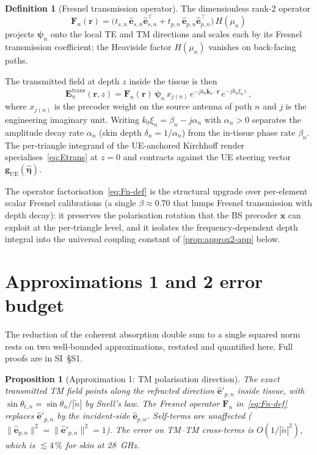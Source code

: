 \documentclass[journal,twocolumn,10pt]{IEEEtran}
\theoremstyle{plain}
\newtheorem{proposition}[theorem]{Proposition}
\theoremstyle{definition}
\newtheorem{definition}[theorem]{Definition}
\theoremstyle{remark}
\newcommand{\EE}{\mathbf{E}}
\newcommand{\Fn}{\mathbf{F}_n}
\newcommand{\psin}{\bm{\psi}_n}
\newcommand{\ntilde}{\tilde{n}}
\begin{document}
\begin{definition}[Fresnel transmission operator]\label{def:fresnel-op}
The dimensionless rank-2 operator
\begin{equation}\label{eq:Fn-def}
  \Fn(\bm{r}) =
  \bigl(t_{s,n}\,\hat{\bm{e}}_{s,n}\hat{\bm{e}}_{s,n}^{\!\top}
       + t_{p,n}\,\hat{\bm{e}}_{p,n}\hat{\bm{e}}_{p,n}^{\!\top}\bigr)\,H(\mu_n)
\end{equation}
projects $\psin$ onto the local TE and TM directions and scales each
by its Fresnel transmission coefficient; the Heaviside factor
$H(\mu_n)$ vanishes on back-facing paths.
\end{definition}

The transmitted field at depth $z$ inside the tissue is then
\begin{equation}\label{eq:Etrans}
  \EE_n^{\mathrm{trans}}(\bm{r},z)
  = \Fn(\bm{r})\,\psin\,x_{j(n)}\,
    e^{-jk_0\hat{\bm{k}}_n\cdot\bm{r}}\,
    e^{-jk_0\xi_n z}\,,
\end{equation}
where $x_{j(n)}$ is the precoder weight on the source antenna of
path $n$ and $j$ is the engineering imaginary unit. Writing
$k_0\xi_n = \beta_n - j\alpha_n$ with $\alpha_n > 0$ separates the
amplitude decay rate $\alpha_n$ (skin depth $\delta_n = 1/\alpha_n$)
from the in-tissue phase rate $\beta_n$. The per-triangle integrand
of the UE-anchored Kirchhoff render specialises~\eqref{eq:Etrans}
at $z = 0$ and contracts against the UE steering vector
$\bm{g}_{\mathrm{UE}}(\hat{\bm{\eta}})$.

The operator factorisation~\eqref{eq:Fn-def} is the structural
upgrade over per-element scalar Fresnel calibrations (a single
$\beta\approx 0.70$ that lumps Fresnel transmission with depth
decay): it preserves the polarisation rotation that the BS
precoder $\bm{x}$ can exploit at the per-triangle level, and it
isolates the frequency-dependent depth integral into the universal
coupling constant of \cref{prop:approx2-app} below.

\section{Approximations 1 and 2 error budget}\label{app:approxs}

The reduction of the coherent absorption double sum to a single
squared norm rests on two well-bounded approximations,
restated and quantified here. Full proofs are in SI~\S{}S1.

\begin{proposition}[Approximation 1: TM polarisation direction]
\label{prop:approx1-app}
The exact transmitted TM field points along the refracted direction
$\hat{\bm{e}}'_{p,n}$ inside tissue, with
$\sin\theta_{t,n} = \sin\theta_n / |\ntilde|$ by Snell's law. The
Fresnel operator $\Fn$ in~\eqref{eq:Fn-def} replaces
$\hat{\bm{e}}'_{p,n}$ by the incident-side $\hat{\bm{e}}_{p,n}$.
Self-terms are unaffected
($\|\hat{\bm{e}}_{p,n}\|^2 = \|\hat{\bm{e}}'_{p,n}\|^2 = 1$).
The error on TM--TM cross-terms is $O(1/|\ntilde|^2)$, which is
$\lesssim 4\,\%$ for skin at 28~GHz.
\end{proposition}
\end{document}
